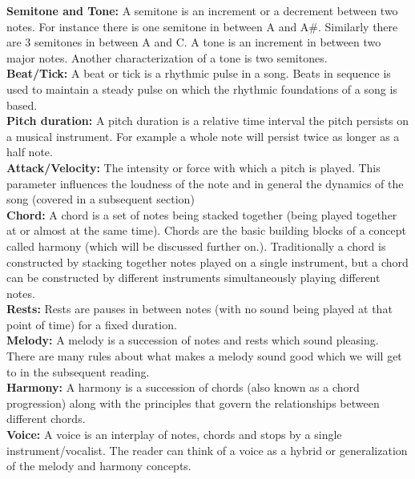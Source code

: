 \noindent \textbf{Semitone and Tone:} A semitone is an increment or a decrement between two notes. For instance there is one semitone in between A and A\#. Similarly there are 3 semitones in between A and C. A tone is an increment in between two major notes. Another characterization of a tone is two semitones. \\

\noindent \textbf{Beat/Tick:} A beat or tick is a rhythmic pulse in a song. Beats in sequence is used to maintain a steady pulse on which the rhythmic foundations of a song is based.  \\

\noindent \textbf{Pitch duration:} A pitch duration is a relative time interval the pitch persists on a musical instrument. For example a whole note will persist twice as longer as a half note.  \\

\noindent \textbf{Attack/Velocity:} The intensity or force with which a pitch is played. This parameter influences the loudness of the note and in general the dynamics of the song (covered in a subsequent section)  \\

\noindent \textbf{Chord:} A chord is a set of notes being stacked together (being played together at or almost at the same time). Chords are the basic building blocks of a concept called harmony (which will be discussed further on.). Traditionally a chord is constructed by stacking together notes played on a single instrument, but a chord can be constructed by different instruments simultaneously playing different notes. \\

\noindent \textbf{Rests:} Rests are pauses in between notes (with no sound being played at that point of time) for a fixed duration. \\

\noindent \textbf{Melody:} A melody is a succession of notes and rests which sound pleasing. There are many rules about what makes a melody sound good which we will get to in the subsequent reading. \\

\noindent \textbf{Harmony:} A harmony is a succession of chords (also known as a chord progression) along with the principles that govern the relationships between different chords. \\

\noindent \textbf{Voice:} A voice is an interplay of notes, chords and stops by a single instrument/vocalist. The reader can think of a voice as a hybrid or generalization of the melody and harmony concepts. \\

